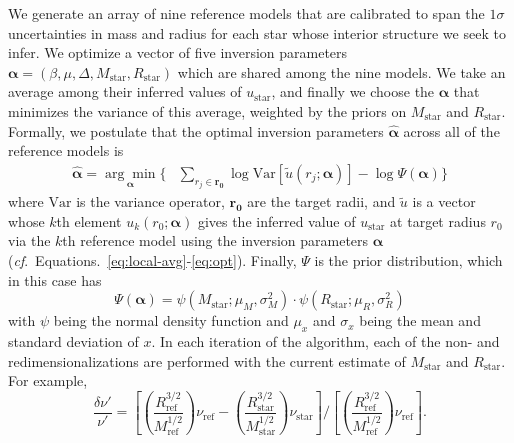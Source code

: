 We generate an array of nine reference models that are calibrated to span the $1\sigma$ uncertainties in mass and radius for each star whose interior structure we seek to infer. 
We optimize a vector of five inversion parameters 
${\boldsymbol\alpha = (\beta, \mu, \Delta, M_{\text{star}}, R_{\text{star}})}$ 
which are shared among the nine models. 
We take an average among their inferred values of $u_{\text{star}}$, and finally we choose the $\boldsymbol \alpha$ that minimizes the variance of this average, weighted by the priors on $M_{\text{star}}$ and $R_{\text{star}}$. 
Formally, we postulate that the optimal inversion parameters $\boldsymbol{\hat{\alpha}}$ across all of the reference models is 
\begin{align} \label{eq:invert-for-agree}
    \boldsymbol{\hat{\alpha}}
    =
    \underset{\boldsymbol{\alpha}}{\arg\min} \Bigg\{ 
    &\sum_{r_j\in \boldsymbol{r_0}} 
            \log \text{Var} \left[ 
                \tilde u\left(r_j; \boldsymbol {\alpha} \right) 
            \right] - \log \Psi(\boldsymbol\alpha)
    \Bigg\}
\end{align}
where 
$\text{Var}$ is the variance operator, 
$\mathbf{r_0}$ are the target radii, 
and $\tilde u$ is a vector whose $k$th element 
${u_k(r_0; \boldsymbol \alpha)}$ gives the inferred value of $u_{\text{star}}$ at target radius $r_0$ via the $k$th reference model using the inversion parameters $\boldsymbol \alpha$
(\emph{cf}.~Equations.~\ref{eq:local-avg}-\ref{eq:opt}). 
Finally, $\Psi$ is the prior distribution, which in this case has
\begin{equation}
    \Psi(\boldsymbol \alpha)
    =
    \psi\left(M_{\text{star}}; \mu_M, \sigma^2_M\right) \cdot
    \psi\left(R_{\text{star}}; \mu_R, \sigma^2_R\right)
\end{equation}
with $\psi$ being the normal density function and 
$\mu_x$ and $\sigma_x$ being the mean and standard deviation of $x$. 
In each iteration of the algorithm, each of the non- and redimensionalizations are performed with the current estimate of $M_{\text{star}}$ and $R_{\text{star}}$. 
For example,
\ifhbonecolumn
\begin{equation}
    \frac{\delta \nu'}{\nu'}
    =
    \left[
        \left(
            \frac{R_{\text{ref}}^{3/2}}{M_{\text{ref}}^{1/2}}
        \right) 
        \nu_{\text{ref}}
        -
        \left(
            \frac{R_{\text{star}}^{3/2}}{M_{\text{star}}^{1/2}}
        \right)
        \nu_{\text{star}}
    \right]
    / 
    \left[
        \left(
            \frac{R_{\text{ref}}^{3/2}}{M_{\text{ref}}^{1/2}}
        \right)
        \nu_{\text{ref}}
    \right]. 
\end{equation} 
